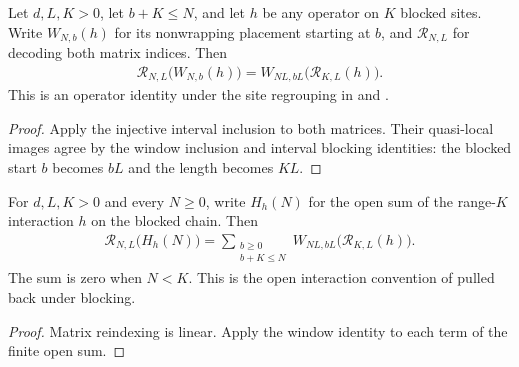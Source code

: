 \begin{lemma}
    \label{thm:blocked_interaction_window}
    \leanok
    Let $d,L,K>0$, let $b+K\leq N$, and let $h$ be any operator on
    $K$ blocked sites. Write $W_{N,b}(h)$ for its nonwrapping placement
    starting at $b$, and $\mathcal R_{N,L}$ for decoding both matrix indices.
    Then
    \begin{align}
        \mathcal R_{N,L}\bigl(W_{N,b}(h)\bigr)
        =W_{NL,bL}\bigl(\mathcal R_{K,L}(h)\bigr).
    \end{align}
    This is an operator identity under the site regrouping in
    \cite[lines~825--836 and Section~3]{Nachtergaele1996Spectral} and
    \cite[Appendix, lines~2308 and 2313--2320]{Cirac2017MPU}.
\end{lemma}
\begin{proof}\leanok
    Apply the injective interval inclusion to both matrices. Their
    quasi-local images agree by the window inclusion and interval blocking
    identities: the blocked start $b$ becomes $bL$ and the length becomes $KL$.
\end{proof}

\begin{lemma}
    \label{thm:blocked_open_interaction_sum}
    \leanok
    For $d,L,K>0$ and every $N\geq0$, write $H_h(N)$ for the open sum
    of the range-$K$ interaction $h$ on the blocked chain. Then
    \begin{align}
        \mathcal R_{N,L}\bigl(H_h(N)\bigr)
        =\sum_{\substack{b\geq0 \\b+K\leq N}}
        W_{NL,bL}\bigl(\mathcal R_{K,L}(h)\bigr).
    \end{align}
    The sum is zero when $N<K$. This is the open interaction convention
    of \cite[equation~(3.12)]{Nachtergaele1996Spectral} pulled back under blocking.
\end{lemma}
\begin{proof}\leanok
    Matrix reindexing is linear. Apply the window identity to each term of
    the finite open sum.
\end{proof}

